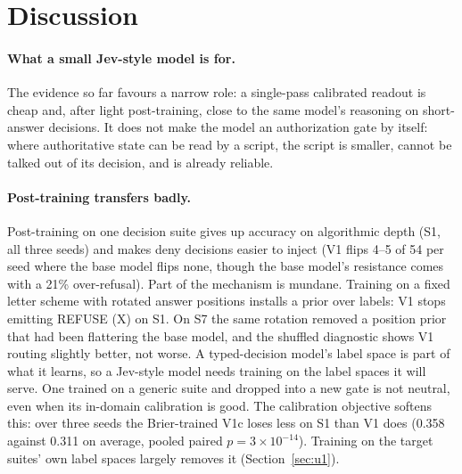 \documentclass[11pt]{article}
\begin{document}
\begin{table}[t]
\centering
\small

\caption{SPEC-U4--U6: Campsite deciders (success of the committed grid; unsafe = a failing grid
committed) and repairers (the repaired grid passes the verifier). Synthetic defects: the U4 test
set. Real proposals: base-model and Bonsai-8B proposals on held-out standard, $8\times8$ and
$10\times10$ puzzles. Rates pool the seeds present. Generated from the run records.}
\label{tab:campsite}
\end{table}

\section{Discussion}

\paragraph{What a small Jev-style model is for.} The evidence so far favours a narrow role: a
single-pass calibrated readout is cheap and, after light post-training, close to the same model's
reasoning on short-answer decisions. It does not make the model an authorization gate by itself:
where authoritative state can be read by a script, the script is smaller, cannot be talked out of its
decision, and is already reliable.

\paragraph{Post-training transfers badly.} Post-training on one decision suite gives up accuracy
on algorithmic depth (S1, all three seeds) and makes deny decisions easier to inject (V1 flips 4--5
of 54 per seed where the base model flips none, though the base model's resistance comes with a
21\% over-refusal). Part of the mechanism is mundane. Training on a fixed letter scheme with
rotated answer positions installs a prior over labels: V1 stops emitting REFUSE (X) on S1. On S7
the same rotation removed a position prior that had been flattering the base model, and the
shuffled diagnostic shows V1 routing slightly better, not worse. A typed-decision model's label space is part of what it learns, so a
Jev-style model needs training on the label spaces it will serve. One trained on a generic suite
and dropped into a new gate is not neutral, even when its in-domain calibration is good. The
calibration objective softens this: over three seeds the Brier-trained V1c loses less on S1 than
V1 does (0.358 against 0.311 on average, pooled paired $p=3\times10^{-14}$). Training on the target
suites' own label spaces largely removes it (Section~\ref{sec:u1}).
\end{document}
